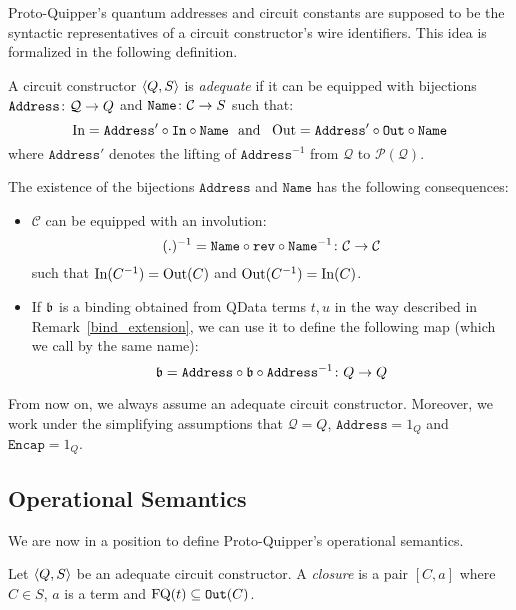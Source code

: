 \documentclass[twoside]{article}
\begin{document}
Proto-Quipper's quantum addresses and circuit constants are supposed 
to be the syntactic representatives of a circuit constructor's wire 
identifiers. This idea is formalized in the following definition.

\begin{definition}
A circuit constructor $\langle Q,S\rangle$ is \emph{adequate} if it can 
be equipped with bijections $\mathtt{Address}\colon \mathcal{Q} \to Q$ 
and $\mathtt{Name}\colon \mathcal{C} \to S$ such that:
\[\mathop{\textrm{In}}\nolimits=\mathtt{Address}' \circ\mathtt{In}\circ \mathtt{Name} 
~\mbox{ and }~ 
\mathop{\textrm{Out}}\nolimits=\mathtt{Address}'\circ\mathtt{Out}\circ \mathtt{Name}
\]
where $\mathtt{Address}'$ denotes the lifting of $\mathtt{Address}^{-1}$ 
from $\mathcal{Q}$ to $\mathcal{P}(\mathcal{Q})$.
\end{definition}

\begin{remark}
\label{structure-transfer}
The existence of the bijections $\mathtt{Address}$ and $\mathtt{Name}$ has 
the following consequences:
\begin{itemize}
  \item $\mathcal{C}$ can be equipped with an involution:
\[
(.)^{-1} = \mathtt{Name}\circ \mathtt{rev} \circ \mathtt{Name}^{-1}
           \colon \mathcal{C}\to\mathcal{C}
\]
such that $\mathop{\textrm{In}}\nolimits(C^{-1})=\mathop{\textrm{Out}}\nolimits(C)$ and 
$\mathop{\textrm{Out}}\nolimits(C^{-1})=\mathop{\textrm{In}}\nolimits(C)$.
  \item If $\mathfrak{b}$ is a binding obtained from QData terms $t,u$ in the 
  way described in Remark~\hyperref[bind_extension]{\ref*{bind_extension}}, 
  we can use it to define the following map (which we call by the same name):
  \[
  \mathfrak{b} = \mathtt{Address}\circ \mathfrak{b}\circ \mathtt{Address}^{-1}\colon Q\to Q
  \]
\end{itemize}

From now on, we always assume an adequate circuit constructor. Moreover, we work 
under the simplifying assumptions that $\mathcal{Q}=Q$, $\mathtt{Address}=1_Q$ 
and $\mathtt{Encap}=1_Q$.
\end{remark}


\subsection{Operational Semantics}

We are now in a position to define Proto-Quipper's operational 
semantics.

\begin{definition}
Let $\langle Q,S\rangle$ be an adequate circuit constructor. A 
\emph{closure} is a pair $[C,a]$ where $C\in S$, $a$ is a 
term and $\mathop{\textrm{FQ}}\nolimits(t)\subseteq\mathtt{Out}(C)$. 
\end{definition}
\end{document}
